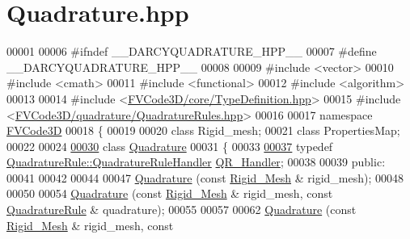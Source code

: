 \hypertarget{Quadrature_8hpp_source}{}\section{Quadrature.\+hpp}
\label{Quadrature_8hpp_source}

\begin{DoxyCode}
00001 
00006 \textcolor{preprocessor}{#ifndef \_\_DARCYQUADRATURE\_HPP\_\_}
00007 \textcolor{preprocessor}{#define \_\_DARCYQUADRATURE\_HPP\_\_}
00008 
00009 \textcolor{preprocessor}{#include <vector>}
00010 \textcolor{preprocessor}{#include <cmath>}
00011 \textcolor{preprocessor}{#include <functional>}
00012 \textcolor{preprocessor}{#include <algorithm>}
00013 
00014 \textcolor{preprocessor}{#include <\hyperlink{TypeDefinition_8hpp}{FVCode3D/core/TypeDefinition.hpp}>}
00015 \textcolor{preprocessor}{#include <\hyperlink{QuadratureRules_8hpp}{FVCode3D/quadrature/QuadratureRules.hpp}>}
00016 
00017 \textcolor{keyword}{namespace }\hyperlink{namespaceFVCode3D}{FVCode3D}
00018 \{
00019 
00020 \textcolor{keyword}{class }Rigid\_mesh;
00021 \textcolor{keyword}{class }PropertiesMap;
00022 
00024 
\hypertarget{Quadrature_8hpp_source.tex_l00030}{}\hyperlink{classFVCode3D_1_1Quadrature}{00030} \textcolor{keyword}{class }\hyperlink{classFVCode3D_1_1Quadrature}{Quadrature}
00031 \{
00033 
\hypertarget{Quadrature_8hpp_source.tex_l00037}{}\hyperlink{classFVCode3D_1_1Quadrature_ac1cc519f7f97b5dbb920ffffb24a2130}{00037}     \textcolor{keyword}{typedef} \hyperlink{classFVCode3D_1_1QuadratureRule_aa112834316b236e0a9072b09fd94d9cc}{QuadratureRule::QuadratureRuleHandler} 
      \hyperlink{classFVCode3D_1_1Quadrature_ac1cc519f7f97b5dbb920ffffb24a2130}{QR\_Handler};
00038 
00039 \textcolor{keyword}{public}:
00041 
00042 
00044 
00047     \hyperlink{classFVCode3D_1_1Quadrature_aefb925716304b6546c5aeba01fab383a}{Quadrature} (\textcolor{keyword}{const} \hyperlink{classFVCode3D_1_1Rigid__Mesh}{Rigid\_Mesh} & rigid\_mesh);
00048 
00050 
00054     \hyperlink{classFVCode3D_1_1Quadrature_aefb925716304b6546c5aeba01fab383a}{Quadrature} (\textcolor{keyword}{const} \hyperlink{classFVCode3D_1_1Rigid__Mesh}{Rigid\_Mesh} & rigid\_mesh, \textcolor{keyword}{const} 
      \hyperlink{classFVCode3D_1_1QuadratureRule}{QuadratureRule} & quadrature);
00055 
00057 
00062     \hyperlink{classFVCode3D_1_1Quadrature_aefb925716304b6546c5aeba01fab383a}{Quadrature} (\textcolor{keyword}{const} \hyperlink{classFVCode3D_1_1Rigid__Mesh}{Rigid\_Mesh} & rigid\_mesh, \textcolor{keyword}{const} 

\end{DoxyCode}
